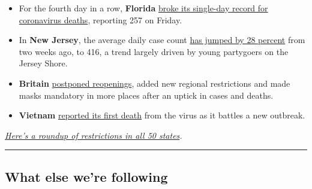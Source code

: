\begin{itemize}
\item
  For the fourth day in a row, \textbf{Florida}
  \href{https://www.nytimes3xbfgragh.onion/2020/07/31/world/coronavirus-covid-19.html\#link-650428f9}{broke
  its single-day record for coronavirus deaths}, reporting 257 on
  Friday.
\item
  In \textbf{New Jersey}, the average daily case count
  \href{https://www.nytimes3xbfgragh.onion/2020/07/30/nyregion/coronavirus-cases-nj.html}{has
  jumped by 28 percent} from two weeks ago, to 416, a trend largely
  driven by young partygoers on the Jersey Shore.
\item
  \textbf{Britain}
  \href{https://www.nytimes3xbfgragh.onion/2020/07/31/world/coronavirus-covid-19.html\#link-20ec72b0}{postponed
  reopenings}, added new regional restrictions and made masks mandatory
  in more places after an uptick in cases and deaths.
\item
  \textbf{Vietnam}
  \href{https://www.bbc.com/news/world-asia-53606917}{reported its first
  death} from the virus as it battles a new outbreak.
\end{itemize}

\href{https://www.nytimes3xbfgragh.onion/interactive/2020/us/states-reopen-map-coronavirus.html}{\emph{Here's
a roundup of restrictions in all 50 states}}\emph{.}

\begin{center}\rule{0.5\linewidth}{\linethickness}\end{center}

\hypertarget{what-else-were-following}{%
\subsection{What else we're following}\label{what-else-were-following}}

